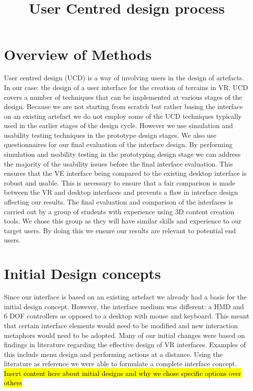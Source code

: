 \documentclass{article}
\title{User Centred design process}
\begin{document}
\maketitle
\section{Overview of Methods}

User centred design (UCD) is a way of involving users in the design of artefacts\cite{abras2004user}. In our case: the design of a user interface for the creation of terrains in VR.
\newline\newline
UCD covers a number of techniques that can be implemented at various stages of the design\cite{abras2004user}. Because we are not starting from scratch but rather basing the interface on an existing artefact we do not employ some of the UCD techniques typically used in the earlier stages of the design cycle\cite{McLoone2004}. However we use simulation and usability testing techniques in the prototype design stages. We also use questionnaires for our final evaluation of the interface design.
\newline\newline 
By performing simulation and usability testing in the prototyping design stage we can address the majority of the usability issues before the final interface evaluation\cite{nielsen1990heuristic}. This ensures that the VE interface being compared to the existing desktop interface is robust and usable. This is necessary to ensure that a fair comparison is made between the VR and desktop interfaces and prevents a flaw in interface design affecting our results.
\newline\newline
The final evaluation and comparison of the interfaces is carried out by a group of students with experience using 3D content creation tools. We chose this group as they will have similar skills and experience to our target users\cite{Bowman2002}. By doing this we ensure our results are relevant to potential end users.

\section{Initial Design concepts}
Since our interface is based on an existing artefact we already had a basis for the initial design concept. However, the interface medium was different: a HMD and 6 DOF controllers as opposed to a desktop with mouse and keyboard. This meant that certain interface elements would need to be modified and new interaction metaphors would need to be adopted.
\newline\newline
Many of our initial changes were based on findings in literature regarding the effective design of VR interfaces. Examples of this include menu design and performing actions at a distance. Using the literature as reference we were able to formulate a complete interface concept.
\newline\newline
\hl{Insert content here about initial designs and why we chose specific options over others}
\end{document}
